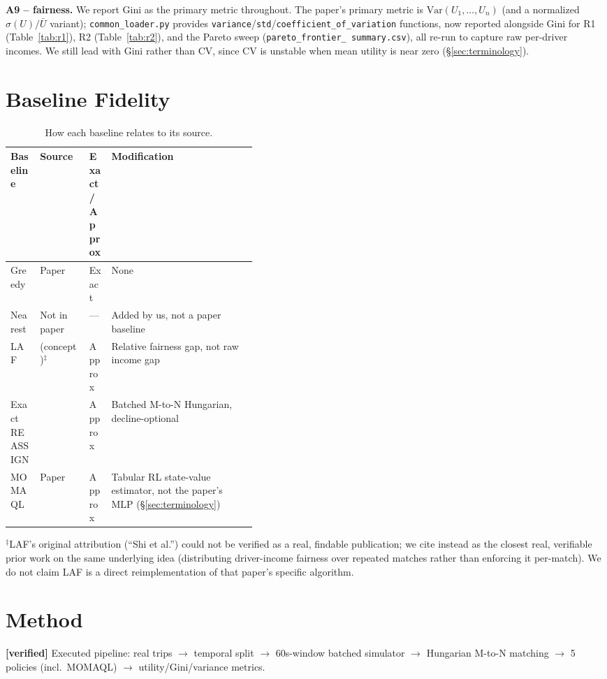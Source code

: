\documentclass[10pt,twocolumn,a4paper]{article}
\newcommand{\verified}{\textbf{[verified]}}
\begin{document}
\textbf{A9 -- fairness.} We report Gini as the primary metric throughout.
The paper's primary metric is $\text{Var}(U_1,\ldots,U_n)$ (and a
normalized $\sigma(U)/\bar U$ variant); \texttt{common\_loader.py} provides
\texttt{variance}/\texttt{std}/\texttt{coefficient\_of\_variation}
functions, now reported alongside Gini for R1 (Table~\ref{tab:r1}), R2
(Table~\ref{tab:r2}), and the Pareto sweep (\texttt{pareto\_frontier\_
summary.csv}), all re-run to capture raw per-driver incomes. We still lead
with Gini rather than CV, since CV is unstable when mean utility is near
zero (\S\ref{sec:terminology}).

\section{Baseline Fidelity}
\begin{table}[t]
\centering
\caption{How each baseline relates to its source.}
\label{tab:baselines}
\footnotesize
\begin{tabularx}{\linewidth}{@{}p{0.12\linewidth}p{0.20\linewidth}p{0.09\linewidth}X@{}}
\toprule
Baseline & Source & Exact/Approx & Modification \\
\midrule
Greedy & Paper & Exact & None \\
Nearest & Not in paper & --- & Added by us, not a paper baseline \\
LAF & \citet{suhr2019} (concept)$^\ddagger$ & Approx & Relative fairness gap, not raw income gap \\
Exact REASSIGN & \citet{lesmana2019} & Approx & Batched M-to-N Hungarian, decline-optional \\
MOMAQL & Paper & Approx & Tabular RL state-value estimator, not the paper's MLP (\S\ref{sec:terminology}) \\
\bottomrule
\end{tabularx}
\end{table}

\noindent\footnotesize$^\ddagger$LAF's original attribution (``Shi et al.'') could not be
verified as a real, findable publication; we cite \citet{suhr2019} instead
as the closest real, verifiable prior work on the same underlying idea
(distributing driver-income fairness over repeated matches rather than
enforcing it per-match). We do not claim LAF is a direct reimplementation
of that paper's specific algorithm.
\normalsize

\section{Method}
\verified{} Executed pipeline: real trips $\to$ temporal
split $\to$ 60s-window batched simulator $\to$ Hungarian M-to-N matching
$\to$ 5 policies (incl.\ MOMAQL) $\to$ utility/Gini/variance metrics.
\end{document}
